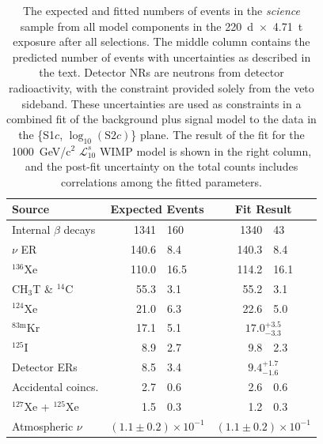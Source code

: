 \begin{table}[th]
    \centering
    \caption{The expected and fitted numbers of events in the \emph{science} sample from all model components in the 220~d~$\times$~4.71~t exposure after all selections.
    The middle column contains the predicted number of events with uncertainties as described in the text. Detector NRs are neutrons from detector radioactivity, with the constraint provided solely from the veto sideband. 
    These uncertainties are used as constraints in a combined fit of the background plus signal model to the data in the \{S1$c$, $\log_{10}(\mathrm{S}2c)$\} plane.  
    The result of the fit for the 1000~GeV/c$^2$ $\mathcal{L}^s_{10}$ WIMP model is shown in the right column, and the post-fit uncertainty on the total counts includes correlations among the fitted parameters.
    }
    \begin{tabular}{l
                r@{$\,\pm\,$}l
                r@{$\,\pm\,$}l}
     \hline 
     \hline 
    Source & \multicolumn{2}{c}{Expected Events} & \multicolumn{2}{c}{Fit Result} \\\hline %
    Internal $\beta$ decays         & 1341   & 160           & 1340   & 43 \\
    $\nu$ ER                        & 140.6  & 8.4           & 140.3  & 8.4 \\
    $^{136}$Xe                      & 110.0  & 16.5          & 114.2  & 16.1 \\
    CH$_3$T \& $^{14}$C             & 55.3   & 3.1           & 55.2   & 3.1 \\
    $^{124}$Xe                      & 21.0   & 6.3           & 22.6   & 5.0 \\
    $^{83\mathrm{m}}$Kr             & 17.1   & 5.1           & \multicolumn{2}{c}{$17.0^{+3.5}_{-3.3}$} \\
    $^{125}$I                       & 8.9    & 2.7           & 9.8   & 2.3 \\
    Detector ERs                    & 8.5    & 3.4           & \multicolumn{2}{c}{$9.4^{+1.7}_{-1.6}$} \\
    Accidental coincs.              & 2.7    & 0.6           & 2.6    & 0.6 \\
    $^{127}$Xe + $^{125}$Xe         & 1.5    & 0.3           & 1.2    & 0.3 \\
    Atmospheric $\nu$               & \multicolumn{2}{c}{$(1.1 \pm 0.2) \times 10^{-1}$} & \multicolumn{2}{c}{$(1.1 \pm 0.2) \times 10^{-1}$} \\

\end{tabular}
\end{table}
